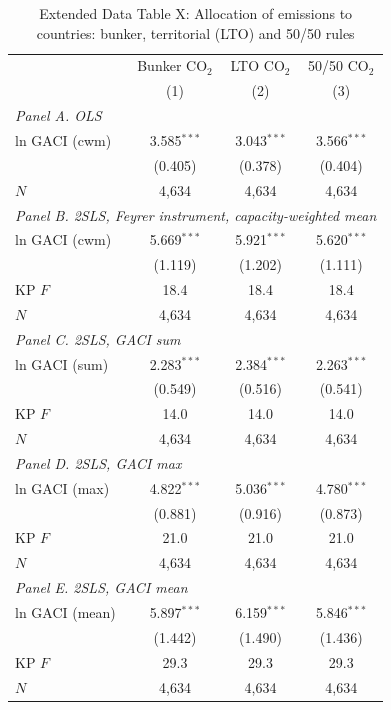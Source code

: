 \begin{table}[htbp]
\centering
\begin{threeparttable}
\caption{Extended Data Table X: Allocation of emissions to countries: bunker, territorial (LTO) and 50/50 rules}
\label{tab:alloc}
\footnotesize
\begin{tabular}{lccc}
\toprule
 & Bunker CO$_2$ & LTO CO$_2$ & 50/50 CO$_2$ \\
 & (1) & (2) & (3) \\
\midrule
\multicolumn{4}{l}{\textit{Panel A. OLS}} \\
  ln GACI (cwm) & 3.585$^{***}$ & 3.043$^{***}$ & 3.566$^{***}$ \\
   & (0.405) & (0.378) & (0.404) \\
  $N$ & 4,634 & 4,634 & 4,634 \\
\midrule
\multicolumn{4}{l}{\textit{Panel B. 2SLS, Feyrer instrument, capacity-weighted mean}} \\
  ln GACI (cwm) & 5.669$^{***}$ & 5.921$^{***}$ & 5.620$^{***}$ \\
   & (1.119) & (1.202) & (1.111) \\
  KP $F$ & 18.4 & 18.4 & 18.4 \\
  $N$ & 4,634 & 4,634 & 4,634 \\
\midrule
\multicolumn{4}{l}{\textit{Panel C. 2SLS, GACI sum}} \\
  ln GACI (sum) & 2.283$^{***}$ & 2.384$^{***}$ & 2.263$^{***}$ \\
   & (0.549) & (0.516) & (0.541) \\
  KP $F$ & 14.0 & 14.0 & 14.0 \\
  $N$ & 4,634 & 4,634 & 4,634 \\
\midrule
\multicolumn{4}{l}{\textit{Panel D. 2SLS, GACI max}} \\
  ln GACI (max) & 4.822$^{***}$ & 5.036$^{***}$ & 4.780$^{***}$ \\
   & (0.881) & (0.916) & (0.873) \\
  KP $F$ & 21.0 & 21.0 & 21.0 \\
  $N$ & 4,634 & 4,634 & 4,634 \\
\midrule
\multicolumn{4}{l}{\textit{Panel E. 2SLS, GACI mean}} \\
  ln GACI (mean) & 5.897$^{***}$ & 6.159$^{***}$ & 5.846$^{***}$ \\
   & (1.442) & (1.490) & (1.436) \\
  KP $F$ & 29.3 & 29.3 & 29.3 \\
  $N$ & 4,634 & 4,634 & 4,634 \\

\end{tabular}
\end{threeparttable}
\end{table}
